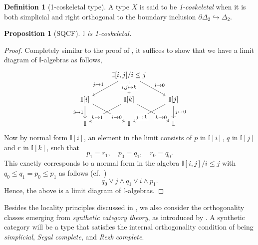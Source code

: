 \documentclass[a4paper,12pt]{amsart}
\newtheorem{proposition}[theorem]{Proposition}
\theoremstyle{definition}
\newtheorem{definition}[theorem]{Definition}
\newcommand{\mbb}[1]{\mathbb{#1}}
\newcommand{\I}{\mbb I}
\newcommand{\hook}{\hookrightarrow}
\begin{document}
\begin{definition}[1-coskeletal type]
  A type $X$ is said to be \emph{1-coskeletal} when it is both simplicial and right orthogonal to the boundary inclusion $\partial\Delta_2 \hook \Delta_2$.
\end{definition}

\begin{proposition}[SQCF]\label{specis1t}
  $\I$ is 1-coskeletal.
\end{proposition}
\begin{proof}
  Completely similar to the proof of , it suffices to show that we have a limit diagram of $\I$-algebras as follows,
  \[\begin{tikzcd}
    & {\I[i,j]/i\le j} \\
    \I[i] & \I[k] & \I[j] \\
    \I & \I & \I
    \arrow["{j \mapsto 1}"', from=1-2, to=2-1]
    \arrow["{i,j \mapsto k}"{description}, from=1-2, to=2-2]
    \arrow["{i \mapsto 0}", from=1-2, to=2-3]
    \arrow["i \mapsto 1"', from=2-1, to=3-1]
    \arrow["i \mapsto 0"{description, pos=0.75}, from=2-1, to=3-2]
    \arrow["k \mapsto 1"{description, pos=0.75}, from=2-2, to=3-1]
    \arrow["k \mapsto 0"{description, pos=0.75}, from=2-2, to=3-3]
    \arrow["j \mapsto 1"{description, pos=0.75}, from=2-3, to=3-2]
    \arrow["j \mapsto 0", from=2-3, to=3-3]
  \end{tikzcd}\]
  Now by normal form $\I[i]$, an element in the limit consists of $p$ in $\I[i]$, $q$ in $\I[j]$ and $r$ in $\I[k]$, such that
  \[ p_1 = r_1, \quad p_0 = q_1, \quad r_0 = q_0. \]
  This exactly corresponds to a normal form in the algebra $\I[i,j]/i\le j$ with $q_0 \le q_1 = p_0 \le p_1$ as follows (cf.\ )
  \[ q_0 \vee j \wedge q_1 \vee i \wedge p_1. \]
  Hence, the above is a limit diagram of $\I$-algebras.
\end{proof}

Besides the locality principles discussed in , we also consider the orthogonality classes emerging from \emph{synthetic category theory}, as introduced by \citet{riehl2017type}. 
A synthetic category will be a type that satisfies the internal orthogonality condition of being \emph{simplicial}, \emph{Segal complete}, and \emph{Rezk complete}.
\end{document}
